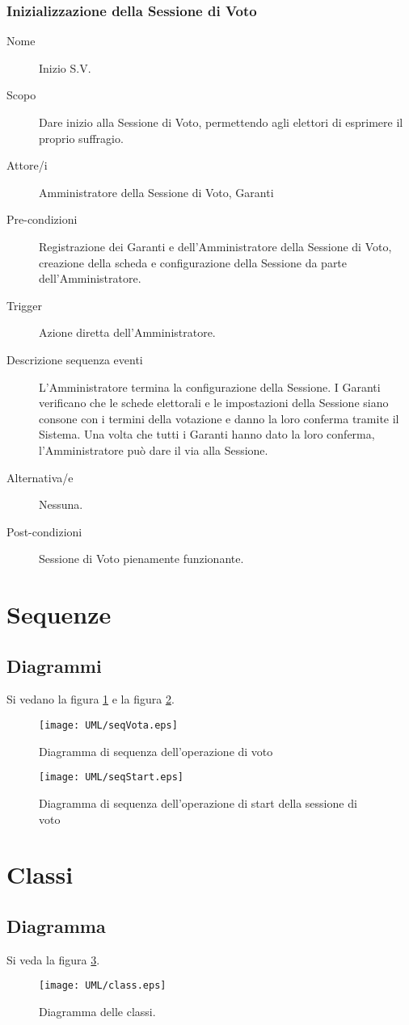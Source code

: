 \subsubsection{Inizializzazione della Sessione di Voto}
\begin{description}
	\item[Nome] Inizio S.V.
	\item[Scopo] Dare inizio alla Sessione di Voto, permettendo agli elettori di esprimere il proprio suffragio.
	\item[Attore/i] Amministratore della Sessione di Voto, Garanti
	\item[Pre-condizioni] Registrazione dei Garanti e dell'Amministratore della Sessione di Voto, creazione della scheda e configurazione della Sessione da parte dell'Amministratore.
	\item[Trigger] Azione diretta dell'Amministratore.
	\item[Descrizione sequenza eventi] L'Amministratore termina la configurazione della Sessione. I Garanti verificano che le schede elettorali e le impostazioni della Sessione siano consone con i termini della votazione e danno la loro conferma tramite il Sistema. Una volta che tutti i Garanti hanno dato la loro conferma, l'Amministratore può dare il via alla Sessione.
	\item[Alternativa/e] Nessuna.
	\item[Post-condizioni] Sessione di Voto pienamente funzionante.
\end{description}




\section{Sequenze}


\subsection{Diagrammi}
Si vedano la figura \ref{fig:seqdiagvota} e la figura \ref{fig:seqdiagstart}.
\begin{figure}[ht]
	\centering
	\texttt{[image: UML/seqVota.eps]}
	\caption{Diagramma di sequenza dell'operazione di voto}
	\label{fig:seqdiagvota}
\end{figure}

\begin{figure}[ht]
	\centering
	\texttt{[image: UML/seqStart.eps]}
	\caption{Diagramma di sequenza dell'operazione di start della sessione di voto}
	\label{fig:seqdiagstart}
\end{figure}


\section{Classi}


\subsection{Diagramma}
Si veda la figura \ref{fig:classdiag}.
\begin{figure}[ht]
	\centering
	\texttt{[image: UML/class.eps]}
	\caption{Diagramma delle classi.}
	\label{fig:classdiag}
\end{figure}
